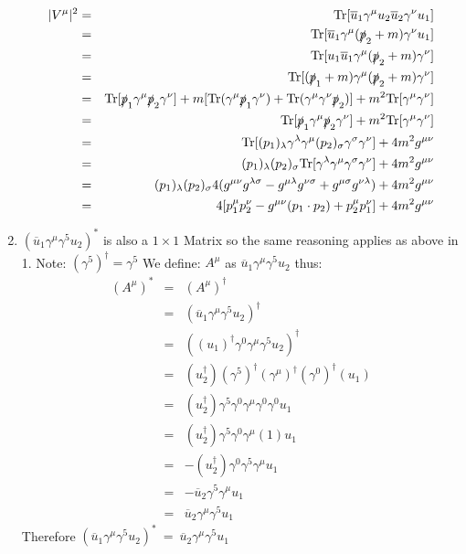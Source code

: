 \documentclass[12pt]{article}
\def \bea{\begin{eqnarray}}
\def \eea{\end{eqnarray}}
\def \Tr{{\rm Tr}}
\def \ou{\overline{u}}
\def \ga{\gamma}
\def \la{\lambda}
\def \si{\sigma}
\begin{document}
\begin{enumerate}
\bea
|V^{\mu}|^2 &=& \Tr[\ou_1 \ga^\mu u_2 \ou_2 \ga^\nu u_1] \\
&=& \Tr[\ou_1 \ga^\mu (\slashed{p}_2+m) \ga^\nu u_1]\\
&=& \Tr[u_1\ou_1 \ga^\mu (\slashed{p}_2+m) \ga^\nu]\\
&=& \Tr[(\slashed{p}_1+m) \ga^\mu (\slashed{p}_2+m) \ga^\nu]\\
&=& \Tr[\slashed{p}_1\ga^\mu \slashed{p}_2 \ga^\nu] + m[\Tr(\ga^\mu \slashed{p}_1\ga^\nu) + \Tr(\ga^\mu \ga^\nu \slashed{p}_2)] + m^2\Tr[\ga^\mu \ga^\nu]\\
&=& \Tr[\slashed{p}_1\ga^\mu \slashed{p}_2 \ga^\nu] + m^2\Tr[\ga^\mu \ga^\nu]\\
&=& \Tr[(p_1)_\la\ga^\la \ga^\mu (p_2)_\si\ga^\si \ga^\nu  ] + 4m^2g^{\mu\nu}\\
&=& (p_1)_\la (p_2)_\si \Tr[\ga^\la \ga^\mu\ga^\si \ga^\nu  ] + 4m^2g^{\mu\nu}\\
&=& (p_1)_\la(p_2)_\si 4(g^{\mu\nu}g^{\la\si} - g^{\mu\la} g^{\nu\si} + g^{\mu\si}g^{\nu\la}) + 4m^2g^{\mu\nu}\\
&=& 4[p_1^\mu p_2^\nu - g^{\mu\nu}(p_1 \cdot p_2) + p_2^\mu p_1^\nu] + 4m^2g^{\mu\nu} 
\eea

\item $(\ou_1\ga^\mu \ga^5 u_2)^*$ is also a $1\times1$ Matrix so the same reasoning applies as above in 1. Note: $(\ga^5)^\dag = \ga^5$
We define: $A^\mu$ as $\ou_1\ga^\mu\ga^5 u_2$ thus:
\bea
(A^\mu)^* &=& (A^\mu)^\dag \\
&=&(\ou_1\ga^\mu\ga^5 u_2)^\dag \\
&=& ((u_1)^\dag\ga^0\ga^\mu\ga^5 u_2)^\dag \\
&=& (u_2^\dag)(\ga^5)^\dag(\ga^\mu)^\dag(\ga^0)^\dag(u_1) \\
&=& (u_2^\dag)\ga^5\ga^0\ga^\mu\ga^0\ga^0 u_1 \\
&=& (u_2^\dag)\ga^5\ga^0\ga^\mu(1) u_1 \\
&=& -(u_2^\dag)\ga^0\ga^5\ga^\mu u_1 \\
&=& -\ou_2\ga^5\ga^\mu u_1 \\
&=& \ou_2\ga^\mu\ga^5 u_1
\eea
%
Therefore $(\ou_1\ga^\mu \ga^5 u_2)^*~=~\ou_2 \ga^\mu \ga^5 u_1$


\end{enumerate}
\end{document}
